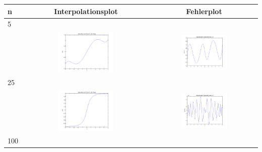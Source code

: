 \documentclass[11pt,a4paper,ngerman]{article}
\begin{document}
\begin{tabular}{l|cc}
n & Interpolationsplot & Fehlerplot \\
\hline
5 & & \\
 & \includegraphics[width=0.45\textwidth]{plotE_TSCHEBY_5.png} & \includegraphics[width=0.45\textwidth]{fehlerTscheby_5.png} \\ 
25 & & \\
& \includegraphics[width=0.45\textwidth]{plotE_TSCHEBY_25.png} & \includegraphics[width=0.45\textwidth]{fehlerTscheby_25.png} \\
100 & & \\

\end{tabular}
\end{document}
